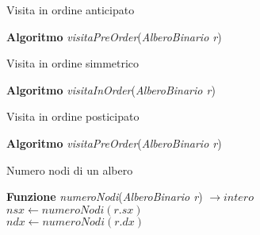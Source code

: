 \begin{algorithm}
    \caption{Visita in ordine anticipato}
    \Indm\textbf{Algoritmo} \emph{visitaPreOrder}(\emph{AlberoBinario r})\\
    \Indp{}
\end{algorithm}

\begin{algorithm}
    \caption{Visita in ordine simmetrico}
    \Indm\textbf{Algoritmo} \emph{visitaInOrder}(\emph{AlberoBinario r})\\
    \Indp{}
\end{algorithm}

\begin{algorithm}
    \caption{Visita in ordine posticipato}
    \Indm\textbf{Algoritmo} \emph{visitaPreOrder}(\emph{AlberoBinario r})\\
    \Indp{}
\end{algorithm}

\begin{algorithm}
    \caption{Numero nodi di un albero}
    \Indm\textbf{Funzione} \emph{numeroNodi}(\emph{AlberoBinario r}) $\rightarrow intero$\\
    \Indp{}
    {
        $nsx \leftarrow numeroNodi(r.sx)$\\
        $ndx \leftarrow numeroNodi(r.dx)$\\
    }
\end{algorithm}
\clearpage


